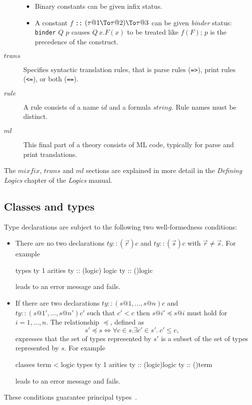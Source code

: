 \begin{description}
\begin{itemize}
  \item Binary constants can be given infix status.

  \item A constant $f$ {\tt::} $(\tau@1\To\tau@2)\To\tau@3$ can be given {\em
    binder} status: {\tt binder} $Q$ $p$ causes $Q\,x.F(x)$ to be treated
  like $f(F)$; $p$ is the precedence of the construct.
  \end{itemize}
\item[$trans$] Specifies syntactic translation rules, that is parse 
  rules ({\tt =>}), print rules ({\tt <=}), or both ({\tt ==}).
\item[$rule$] A rule consists of a name $id$ and a formula $string$.  Rule
  names must be distinct.
\item[$ml$] This final part of a theory consists of ML code, 
  typically for parse and print translations.
\end{description}
The $mixfix$, $trans$ and $ml$ sections are explained in more detail in 
the {\it Defining Logics} chapter of the {\it Logics} manual.


\subsection{Classes and types}

Type declarations are subject to the following two well-formedness
conditions:
\begin{itemize}
\item There are no two declarations $ty :: (\vec{r})c$ and $ty :: (\vec{s})c$
  with $\vec{r} \neq \vec{s}$.  For example
\begin{ttbox}
types ty 1
arities ty :: ({\ttlbrace}logic{\ttrbrace}) logic
        ty :: ({\ttlbrace}{\ttrbrace})logic
\end{ttbox}
leads to an error message and fails.
\item If there are two declarations $ty :: (s@1,\dots,s@n)c$ and $ty ::
  (s@1',\dots,s@n')c'$ such that $c' < c$ then $s@i' \preceq s@i$ must hold
  for $i=1,\dots,n$.  The relationship $\preceq$, defined as
\[ s' \preceq s \iff \forall c\in s. \exists c'\in s'.~ c'\le c, \]
expresses that the set of types represented by $s'$ is a subset of the set of
types represented by $s$.  For example
\begin{ttbox}
classes term < logic
types ty 1
arities ty :: ({\ttlbrace}logic{\ttrbrace})logic
        ty :: ({\ttlbrace}{\ttrbrace})term
\end{ttbox}
leads to an error message and fails.
\end{itemize}
These conditions guarantee principal types~\cite{nipkow-prehofer}.



